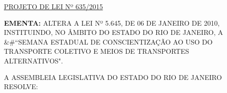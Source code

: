 \documentclass[10pt]{article}
\date{}
\begin{document}
\maketitle
\begin{center}
  \huge
  \vspace{-3cm}\href{http://alerjln1.alerj.rj.gov.br/scpro1519.nsf/f4b46b3cdbba990083256cc900746cf6/2610e42fb729daa583257e7d00675a7c?OpenDocument}{PROJETO DE LEI Nº 635/2015}
\bigskip
\bigskip
\bigskip
  
\end{center}

\textbf{EMENTA:} 
ALTERA A LEI Nº 5.645, DE 06 DE JANEIRO DE 2010, INSTITUINDO, NO ÂMBITO DO ESTADO DO RIO DE JANEIRO, A &#``SEMANA ESTADUAL DE CONSCIENTIZAÇÃO AO USO DO TRANSPORTE COLETIVO E MEIOS DE TRANSPORTES ALTERNATIVOS".








\bigskip

\noindent
A ASSEMBLEIA LEGISLATIVA DO ESTADO DO RIO DE JANEIRO RESOLVE:
\end{document}
